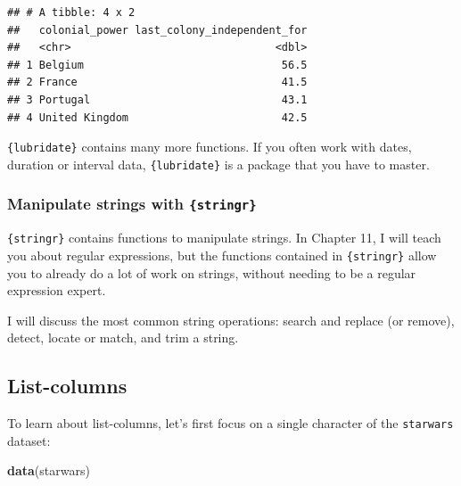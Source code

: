 \documentclass[]{gitbook}
\newenvironment{Shaded}{\begin{snugshade}}{\end{snugshade}}
\newcommand{\KeywordTok}[1]{\textcolor[rgb]{0.13,0.29,0.53}{\textbf{#1}}}
\newcommand{\NormalTok}[1]{#1}
\newcommand{\OperatorTok}[1]{\textcolor[rgb]{0.81,0.36,0.00}{\textbf{#1}}}
\newcommand{\StringTok}[1]{\textcolor[rgb]{0.31,0.60,0.02}{#1}}
\theoremstyle{definition}
\theoremstyle{definition}
\theoremstyle{definition}
\theoremstyle{remark}
\begin{document}
\begin{verbatim}
## # A tibble: 4 x 2
##   colonial_power last_colony_independent_for
##   <chr>                                <dbl>
## 1 Belgium                               56.5
## 2 France                                41.5
## 3 Portugal                              43.1
## 4 United Kingdom                        42.5
\end{verbatim}

\texttt{\{lubridate\}} contains many more functions. If you often work
with dates, duration or interval data, \texttt{\{lubridate\}} is a
package that you have to master.

\hypertarget{manipulate-strings-with-stringr}{%
\subsubsection{\texorpdfstring{Manipulate strings with
\texttt{\{stringr\}}}{Manipulate strings with \{stringr\}}}\label{manipulate-strings-with-stringr}}

\texttt{\{stringr\}} contains functions to manipulate strings. In
Chapter 11, I will teach you about regular expressions, but the
functions contained in \texttt{\{stringr\}} allow you to already do a
lot of work on strings, without needing to be a regular expression
expert.

I will discuss the most common string operations: search and replace (or
remove), detect, locate or match, and trim a string.

\hypertarget{list-columns}{%
\subsection{List-columns}\label{list-columns}}

To learn about list-columns, let's first focus on a single character of
the \texttt{starwars} dataset:

\begin{Shaded}
\begin{Highlighting}[]
\KeywordTok{data}\NormalTok{(starwars)}
\end{Highlighting}
\end{Shaded}

\begin{Shaded}
\end{Shaded}
\end{document}
